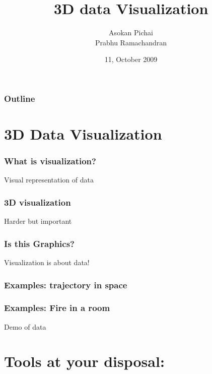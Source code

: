 \documentclass[compress,14pt]{beamer}
\title[]{3D data Visualization}
\author[FOSSEE Team] {Asokan Pichai\\Prabhu Ramachandran}
\institute[IIT Bombay] {Department of Aerospace Engineering\\IIT Bombay}
\date[] {11, October 2009}
\date[] %
\newcounter{time}
\newcommand{\inctime}[1]{\addtocounter{time}{#1}{\vspace*{0.1in}\tiny \thetime\ m}}
\begin{document}
\begin{frame}
  \maketitle
\end{frame}

\begin{frame}
  \frametitle{Outline}
  \Large
  \tableofcontents
\end{frame}

\section{3D Data Visualization}

\begin{frame}
    \frametitle{What is visualization?}
    \Large
    \begin{center}
    Visual representation of data
    \end{center}
\end{frame}

\begin{frame}
    \frametitle{3D visualization}
    \Large
    \begin{center}
        Harder but important
    \end{center}
\end{frame}

\begin{frame}
    \frametitle{Is this Graphics?}
    \Large
    \begin{center}
        Visualization is about data!
    \end{center}
\end{frame}

\begin{frame}
    \frametitle{Examples: trajectory in space}
    \Large
    \begin{center}
    \end{center}
\end{frame}

\begin{frame}
    \frametitle{Examples: Fire in a room}
    \Large
    \begin{center}
        Demo of data
    \end{center}
\inctime{10}
\end{frame}

\section{Tools at your disposal:}
\end{document}
